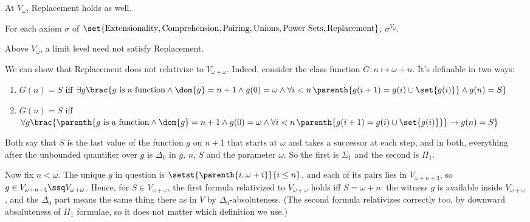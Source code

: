 At $V_{\omega}$, Replacement holds as well.

\begin{boxproposition}
    For each axiom $\sigma$ of $\set{\text{Extensionality}, \text{Comprehension}, \text{Pairing}, \text{Unions}, \text{Power Sets}, \text{Replacement}}$, $\sigma^{V_{\omega}}$.
\end{boxproposition}

Above $V_{\omega}$, a limit level need not satisfy Replacement.

\begin{boxnexample}
    We can show that Replacement does not relativize to $V_{\omega + \omega}$. Indeed, consider the class function $G : n \mapsto \omega + n$. It's definable in two ways:
    \begin{enumerate}
        \item $G(n) = S$ iff $\exists g \brac{g \text{ is a function} \land \dom{g} = n + 1 \land g(0) = \omega \land \forall i < n \, \parenth{g(i + 1) = g(i) \cup \set{g(i)}} \land g(n) = S}$
        \item $G(n) = S$ iff $\forall g \brac{\parenth{g \text{ is a function} \land \dom{g} = n + 1 \land g(0) = \omega \land \forall i < n \, \parenth{g(i + 1) = g(i) \cup \set{g(i)}}} \to g(n) = S}$
    \end{enumerate}
    Both say that $S$ is the last value of the function $g$ on $n + 1$ that starts at $\omega$ and takes a successor at each step, and in both, everything after the unbounded quantifier over $g$ is $\Delta_0$ in $g$, $n$, $S$ and the parameter $\omega$. So the first is $\Sigma_1$ and the second is $\Pi_1$.

    Now fix $n < \omega$. The unique $g$ in question is $\setst{\parenth{i, \omega + i}}{i \leq n}$, and each of its pairs lies in $V_{\omega + n + 3}$, so $g \in V_{\omega + n + 4} \ssq V_{\omega + \omega}$. Hence, for $S \in V_{\omega + \omega}$, the first formula relativized to $V_{\omega + \omega}$ holds iff $S = \omega + n$: the witness $g$ is available inside $V_{\omega + \omega}$, and the $\Delta_0$ part means the same thing there as in $V$ by $\Delta_0$-absoluteness. (The second formula relativizes correctly too, by downward absoluteness of $\Pi_1$ formulae, so it does not matter which definition we use.)


\end{boxnexample}
